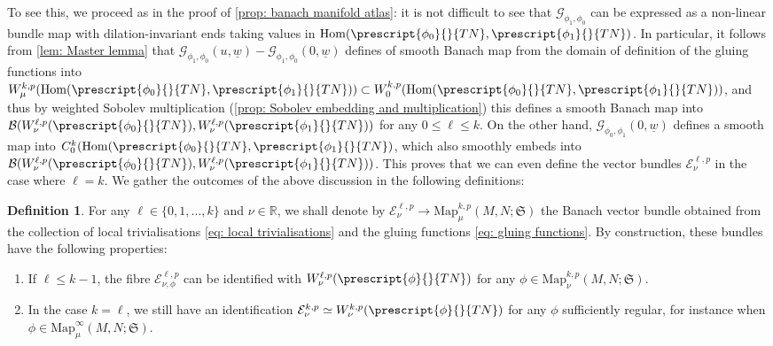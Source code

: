 \documentclass{article}
\numberwithin{equation}{section}        %
\theoremstyle{bfnote}
\theoremstyle{definition}
\newtheorem{Def}[thm]{Definition}           %
\theoremstyle{bfremark}
\newcommand{\R}{\mathbb{R}}                 %
\newcommand{\Map}{\mathrm{Map}}             %
\DeclareMathOperator{\Hom}{Hom}                 %
\begin{document}
To see this, we proceed as in the proof of \cref{prop: banach manifold atlas}: it is not difficult to see that $\mathcal{G}_{\phi_1,\phi_0}$ can be expressed as a non-linear bundle map with dilation-invariant ends taking values in $\Hom(\prescript{\phi_0}{}{TN},\prescript{\phi_1}{}{TN})$. In particular, it follows from \cref{lem: Master lemma} that $\mathcal{G}_{\phi_1,\phi_0}(u,\underline{w}) - \mathcal{G}_{\phi_1,\phi_0}(0,\underline{w})$ defines of smooth Banach map from the domain of definition of the gluing functions into $W^{k,p}_\mu(\Hom(\prescript{\phi_0}{}{TN},\prescript{\phi_1}{}{TN})) \subset W^{k,p}_0(\Hom(\prescript{\phi_0}{}{TN},\prescript{\phi_1}{}{TN}))$, and thus by weighted Sobolev multiplication (\cref{prop: Sobolev embedding and multiplication}) this defines a smooth Banach map into $\mathcal{B}(W^{\ell,p}_\nu(\prescript{\phi_0}{}{TN}),W^{\ell,p}_\nu(\prescript{\phi_1}{}{TN}))$ for any $0 \leq \ell \leq k$. On the other hand, $\mathcal{G}_{\phi_0,\phi_1}(0,\underline{w})$ defines a smooth map into $C^k_0(\Hom(\prescript{\phi_0}{}{TN},\prescript{\phi_1}{}{TN})$, which also smoothly embeds into $\mathcal{B}(W^{\ell,p}_\nu(\prescript{\phi_0}{}{TN}),W^{\ell,p}_\nu(\prescript{\phi_1}{}{TN}))$. This proves that we can even define the vector bundles $\mathcal{E}^{\ell,p}_\nu$ in the case where $\ell = k$. We gather the outcomes of the above discussion in the following definitions:

\begin{Def}
    For any $\ell \in \{0,1,\ldots,k\}$ and $\nu \in \R$, we shall denote by $\mathcal{E}^{\ell,p}_\nu \to \Map^{k,p}_\mu(M,N;\mathfrak{S})$ the Banach vector bundle obtained from the collection of local trivialisations \eqref{eq: local trivialisations} and the gluing functions \eqref{eq: gluing functions}. By construction, these bundles have the following properties:
    \begin{enumerate}
        \item If $\ell \leq k-1$, the fibre $\mathcal{E}^{\ell,p}_{\nu,\phi}$ can be identified with $W^{\ell,p}_\nu(\prescript{\phi}{}{TN})$ for any $\phi \in \Map^{k,p}_\nu(M,N;\mathfrak{S})$. 

        \item In the case $k = \ell$, we still have an identification $\mathcal{E}^{k,p}_\nu \simeq W^{k,p}_\nu(\prescript{\phi}{}{TN})$ for any $\phi$ sufficiently regular, for instance when $\phi \in \Map^\infty_\mu(M,N;\mathfrak{S})$.
    \end{enumerate}
\end{Def}
\end{document}
